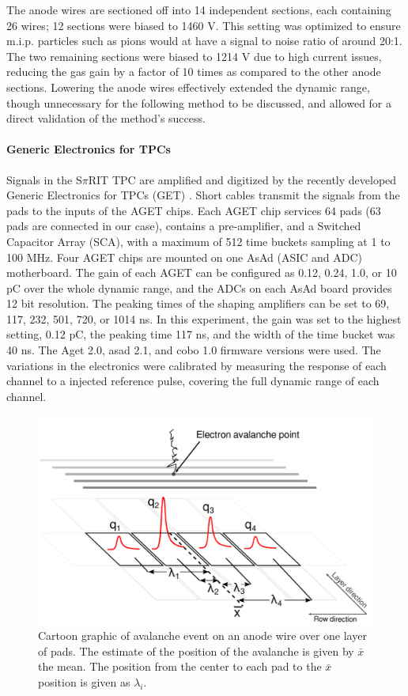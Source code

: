 \documentclass[review]{elsarticle}
\begin{document}
The anode wires are sectioned off into 14 independent sections, each containing 26 wires; 12 sections were biased to 1460 V. This setting was optimized to ensure m.i.p. particles such as pions would at have a signal to noise ratio of around 20:1. The two remaining sections were biased to 1214 V due to high current issues, reducing the gas gain by a factor of 10 times as compared to the other anode sections. Lowering the anode wires effectively extended the dynamic range, though unnecessary for the following method to be discussed, and allowed for a direct validation of the method's success. 

\paragraph{Generic Electronics for TPCs}
Signals in the S$\pi$RIT TPC are amplified and digitized by the recently developed Generic Electronics for TPCs (GET) \cite{get}.  Short cables transmit the signals from the pads to the inputs of the AGET chips. Each AGET chip services 64 pads (63 pads are connected in our case), contains a pre-amplifier, and a Switched Capacitor Array (SCA), with a maximum of 512 time buckets sampling at 1 to 100 MHz. Four AGET chips are mounted on one AsAd (ASIC and ADC) motherboard. The gain of each AGET can be configured as 0.12, 0.24, 1.0, or 10 pC over the whole dynamic range, and the ADCs on each AsAd board provides 12 bit resolution. The peaking times of the shaping amplifiers can be set to 69, 117, 232, 501, 720, or 1014 ns. In this experiment, the gain was set to the highest setting, 0.12 pC, the peaking time 117 ns, and the width of the time bucket was 40 ns. The Aget 2.0, asad 2.1, and cobo 1.0 firmware versions were used. The variations in the electronics were calibrated by measuring the response of each channel to a injected reference pulse, covering the full dynamic range of each channel. 

\begin{figure}[H]
\includegraphics[width=\linewidth]{defofavalanche}
\caption{Cartoon graphic of avalanche event on an anode wire over one layer of pads. The estimate of the position of the avalanche is given by $\bar{x}$  the mean. The position from the center to each pad to the $\bar{x}$ position is given as $\lambda_i$.}
\label{fig:av}
\end{figure}
\end{document}
